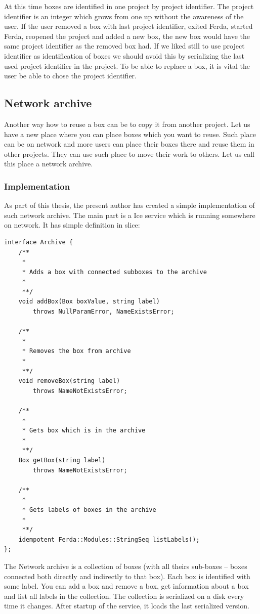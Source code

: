 \documentclass[a4paper,12pt]{book}
\begin{document}
At this time boxes are identified in one project by project identifier. The project identifier is an integer which grows from one up without the awareness of the user. If the user removed a box with last project identifier, exited Ferda, started Ferda, reopened the project and added a new box, the new box would have the same project identifier as the removed box had. If we liked still to use project identifier as identification of boxes we should avoid this by serializing the last used project identifier in the project. To be able to replace a box, it is vital the user be able to chose the project identifier.

\subsection{Network archive}
Another way how to reuse a box can be to copy it from another project. Let us have a new place where you can place boxes which you want to reuse. Such place can be on network and more users can place their boxes there and reuse them in other projects. They can use such place to move their work to others. Let us call this place a network archive.

\subsubsection{Implementation}
As part of this thesis, the present author has created a simple implementation of such network archive. The main part is a Ice service which is running somewhere on network. It has simple definition in slice:
\begin{verbatim}
interface Archive {
	/**
	 *
	 * Adds a box with connected subboxes to the archive
	 *
	 **/
	void addBox(Box boxValue, string label)
		throws NullParamError, NameExistsError;

	/**
	 *
	 * Removes the box from archive
	 *
	 **/
	void removeBox(string label)
		throws NameNotExistsError;

	/**
	 *
	 * Gets box which is in the archive
	 *
	 **/
	Box getBox(string label)
		throws NameNotExistsError;

	/**
	 *
	 * Gets labels of boxes in the archive
	 *
	 **/
	idempotent Ferda::Modules::StringSeq listLabels();
};
\end{verbatim}

The Network archive is a collection of boxes (with all theirs sub-boxes -- boxes connected both directly and indirectly to that box). Each box is identified with some label. You can add a box and remove a box, get information about a box and list all labels in the collection. The collection is serialized on a disk every time it changes. After startup of the service, it loads the last serialized version.
\end{document}
